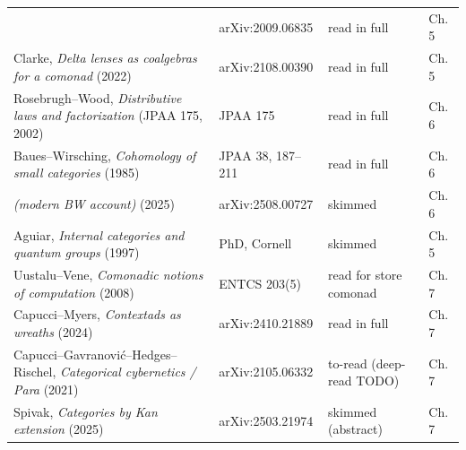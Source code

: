 \documentclass[11pt,a4paper]{book}
\theoremstyle{plain}
\theoremstyle{definition}
\theoremstyle{remark}
\begin{document}
\begin{center}
\begin{tabular}{@{}p{5.4cm}p{3.1cm}p{2.4cm}p{2.6cm}@{}}
  & arXiv:2009.06835 & read in full & Ch.\,5 \\
Clarke, \emph{Delta lenses as coalgebras for a comonad} (2022)
  & arXiv:2108.00390 & read in full & Ch.\,5 \\
Rosebrugh--Wood, \emph{Distributive laws and factorization} (JPAA 175, 2002)
  & JPAA 175 & read in full & Ch.\,6 \\
Baues--Wirsching, \emph{Cohomology of small categories} (1985)
  & JPAA 38, 187--211 & read in full & Ch.\,6 \\
\emph{(modern BW account)} (2025)
  & arXiv:2508.00727 & skimmed & Ch.\,6 \\
Aguiar, \emph{Internal categories and quantum groups} (1997)
  & PhD, Cornell & skimmed & Ch.\,5 \\
Uustalu--Vene, \emph{Comonadic notions of computation} (2008)
  & ENTCS 203(5) & read for store comonad & Ch.\,7 \\
Capucci--Myers, \emph{Contextads as wreaths} (2024)
  & arXiv:2410.21889 & read in full & Ch.\,7 \\
Capucci--Gavranovi\'c--Hedges--Rischel, \emph{Categorical cybernetics / Para} (2021)
  & arXiv:2105.06332 & to-read (deep-read TODO) & Ch.\,7 \\
Spivak, \emph{Categories by Kan extension} (2025)
  & arXiv:2503.21974 & skimmed (abstract) & Ch.\,7 \\
\bottomrule
\end{tabular}
\end{center}
\end{document}
